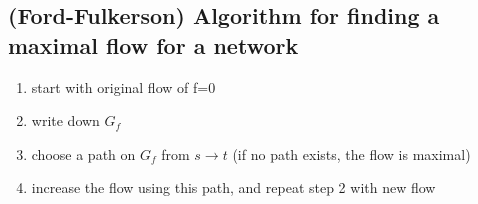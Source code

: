\documentclass[12pt]{article}
\begin{document}
\subsection{(Ford-Fulkerson) Algorithm for finding a maximal flow for a network}

\begin{enumerate}
	\item{start with original flow of f=0}
	\item{write down $G_f$}
	\item{choose a path on $G_f$ from $s\rightarrow t$ (if no path exists, the flow is maximal)}
	\item{increase the flow using this path, and repeat step 2 with new flow}
\end{enumerate}
\end{document}
